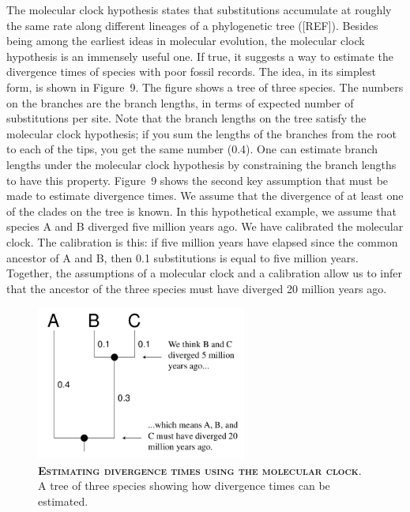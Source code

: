 \documentclass{svmult}
\begin{document}
The molecular clock hypothesis states that substitutions accumulate at roughly the same rate along different lineages of a phylogenetic tree ([REF]). 
Besides being among the earliest ideas in molecular evolution, the molecular clock hypothesis is an immensely useful one. If true, it suggests
a way to estimate the divergence times of species with poor fossil records. The idea, in its simplest form, is shown in Figure~9. The figure shows
a tree of three species. The numbers on the branches are the branch lengths, in terms of expected number of substitutions per site.
Note that the branch lengths on the tree satisfy the molecular clock hypothesis; if you sum the lengths of the branches from the root to each of the
tips, you get the same number (0.4). One can estimate branch lengths under the molecular clock hypothesis by constraining the branch lengths to have
this property. Figure~9 shows the second key assumption that must be made to estimate divergence times. We assume that the divergence of at least
one of the clades on the tree is known. In this hypothetical example, we assume that species A and B diverged five million years ago. We have calibrated
the molecular clock. The calibration is this: if five million years have elapsed since the common ancestor of A and B, then 0.1 substitutions is equal
to five million years. Together, the assumptions of a molecular clock and a calibration allow us to infer that the ancestor of the three species must have
diverged 20 million years ago.
\begin{figure}[t]
\centering
\includegraphics[height=2in]{fig9}
\caption{\textbf{\textsc{Estimating divergence times using the molecular clock}}.
A tree of three species showing how divergence times can be estimated.}
\label{fig9}
\end{figure}
\end{document}
